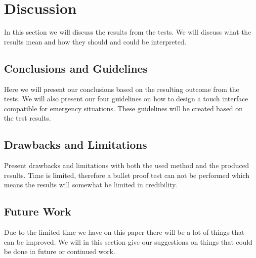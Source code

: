 \documentclass[runningheads,a4paper,oribibl]{llncs}
\begin{document}
\section{Discussion}
In this section we will discuss the results from the tests. We will discuss what the results mean and how they should and could be interpreted.

\subsection{Conclusions and Guidelines}
Here we will present our conclusions based on the resulting outcome from the tests. We will also present our four guidelines on how to design a touch interface compatible for emergency situations. These guidelines will be created based on the test results.

\subsection{Drawbacks and Limitations}
Present drawbacks and limitations with both the used method and the produced results. Time is limited, therefore a bullet proof test can not be performed which means the results will somewhat be limited in credibility.

\subsection{Future Work}
Due to the limited time we have on this paper there will be a lot of things that can be improved. We will in this section give our suggestions on things that could be done in future or continued work.

%
\nocite{*}  %

%
%
% 
%


\end{document}
